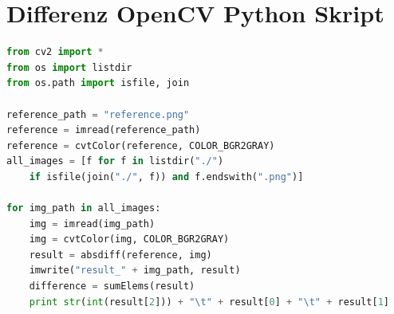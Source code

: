 \chapter{Differenz OpenCV Python Skript}

\begin{lstlisting}[mathescape,caption=Python Implementierung der Bilddifferenz, label=lst:compare, language=Python]
from cv2 import *
from os import listdir
from os.path import isfile, join

reference_path = "reference.png"
reference = imread(reference_path)
reference = cvtColor(reference, COLOR_BGR2GRAY)
all_images = [f for f in listdir("./") 
    if isfile(join("./", f)) and f.endswith(".png")]
    
for img_path in all_images:
    img = imread(img_path)
    img = cvtColor(img, COLOR_BGR2GRAY)
    result = absdiff(reference, img)
    imwrite("result_" + img_path, result)
    difference = sumElems(result)
    print str(int(result[2])) + "\t" + result[0] + "\t" + result[1]
\end{lstlisting}